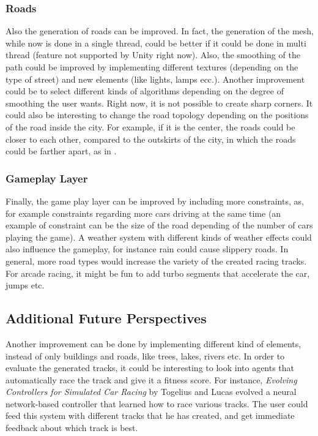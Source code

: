 \documentclass[conference]{IEEEtran}
\begin{document}
\subsubsection{Roads}

Also the generation of roads can be improved. In fact, the generation of the mesh, while now is done in a single thread, could be better if it could be done in multi thread (feature not supported by Unity right now). Also, the smoothing of the path could be improved by implementing different textures (depending on the type of street) and new elements (like lights, lamps ecc.). Another improvement could be to select different kinds of algorithms depending on the degree of smoothing the user wants. Right now, it is not possible to create sharp corners. It could also be interesting to change the road topology depending on the positions of the road inside the city. For example, if it is the center, the roads could be closer to each other, compared to the outskirts of the city, in which the roads could be farther apart, as in \cite{afghan}.

\subsubsection{Gameplay Layer}

Finally, the game play layer can be improved by including more constraints, as, for example constraints regarding more cars driving at the same time (an example of constraint can be the size of the road depending of the number of cars playing the game). A weather system with different kinds of weather effects could also influence the gameplay, for instance rain could cause slippery roads. In general, more road types would increase the variety of the created racing tracks. For arcade racing, it might be fun to add turbo segments that accelerate the car, jumps etc.

\subsection{Additional Future Perspectives}
Another improvement can be done by implementing different kind of elements, instead of only buildings and roads, like trees, lakes, rivers etc. In order to evaluate the generated tracks, it could be interesting to look into agents that automatically race the track and give it a fitness score. For instance, \emph{Evolving Controllers for Simulated Car Racing} by Togelius and Lucas \cite{julian} evolved a neural network-based controller that learned how to race various tracks. The user could feed this system with different tracks that he has created, and get immediate feedback about which track is best.
\end{document}

